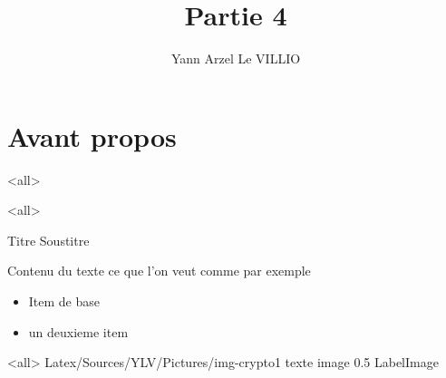 
%


\title{Partie 4}
\author{Yann Arzel Le VILLIO}



\maketitle

\section{Avant propos}





\mode<all>{}





\mode<all>{\texframe
{Titre} %
{Soustitre} %
{
	Contenu du texte ce que l'on veut comme par exemple
 \begin{itemize}
    \item Item de base
    \item un deuxieme item
 \end{itemize}
}}


\mode<all>{\picframe
{Latex/Sources/YLV/Pictures/img-crypto1}%
{texte image} %
{0.5} %
{LabelImage} %
}
